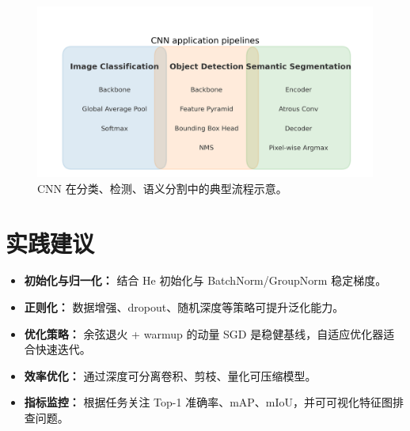 ﻿\documentclass[UTF8,zihao=-4]{ctexart}
\begin{document}
\begin{figure}[H]
  \centering
  \includegraphics[width=0.85\linewidth]{cnn_applications_overview.png}
  \caption{CNN 在分类、检测、语义分割中的典型流程示意。}
  \label{fig:cnn_applications_cn}
\end{figure}
\FloatBarrier

\section{实践建议}
\begin{itemize}
  \item \textbf{初始化与归一化：} 结合 He 初始化与 BatchNorm/GroupNorm 稳定梯度。\item \textbf{正则化：} 数据增强、dropout、随机深度等策略可提升泛化能力。\item \textbf{优化策略：} 余弦退火 + warmup 的动量 SGD 是稳健基线，自适应优化器适合快速迭代。\item \textbf{效率优化：} 通过深度可分离卷积、剪枝、量化可压缩模型。\item \textbf{指标监控：} 根据任务关注 Top-1 准确率、mAP、mIoU，并可可视化特征图排查问题。\end{itemize}
\end{document}
